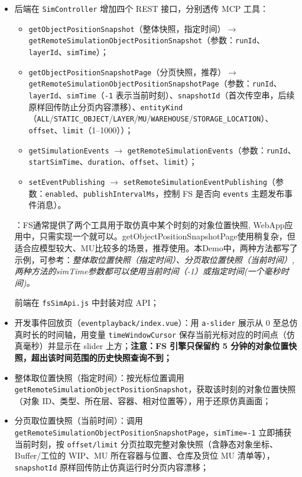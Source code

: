 \begin{enumerate}[label=\arabic*)]
	\begin{itemize}
		\item 后端在 \texttt{SimController} 增加四个 REST 接口，分别透传 MCP 工具：
		\begin{itemize}
			\item \texttt{getObjectPositionSnapshot}（整体快照，指定时间）$\rightarrow$ \texttt{getRemoteSimulationObjectPositionSnapshot}（参数：\texttt{runId}、\texttt{layerId}、\texttt{simTime}）；
			\item \texttt{getObjectPositionSnapshotPage}（分页快照，推荐）$\rightarrow$ \texttt{getRemoteSimulationObjectPositionSnapshotPage}（参数：\texttt{runId}、\texttt{layerId}、\texttt{simTime}（\texttt{-1} 表示当前时刻）、\texttt{snapshotId}（首次传空串，后续原样回传防止分页内容漂移）、\texttt{entityKind}（\texttt{ALL}/\texttt{STATIC\_OBJECT}/\texttt{LAYER}/\texttt{MU}/\texttt{WAREHOUSE}/\texttt{STORAGE\_LOCATION}）、\texttt{offset}、\texttt{limit}（1--1000））；
			\item \texttt{getSimulationEvents} $\rightarrow$ \texttt{getRemoteSimulationEvents}（参数：\texttt{runId}、\texttt{startSimTime}、\texttt{duration}、\texttt{offset}、\texttt{limit}）；
			\item \texttt{setEventPublishing} $\rightarrow$ \texttt{setRemoteSimulationEventPublishing}（参数：\texttt{enabled}、\texttt{publishIntervalMs}，控制 FS 是否向 \texttt{events} 主题发布事件消息）。
		\end{itemize}
        ：FS通常提供了两个工具用于取仿真中某个时刻的对象位置快照, WebApp应用中，只需实现一个就可以。getObjectPositionSnapshotPage使用稍复杂，但适合应模型较大、MU比较多的场景，推荐使用。本Demo中，两种方法都写了示例，可参考：\it{整体取位置快照（指定时间）}、\it{分页取位置快照（当前时间）}, 两种方法的simTime参数都可以使用当前时间（-1）或指定时间(一个毫秒时间)。\par
		前端在 \texttt{fsSimApi.js} 中封装对应 API；
		\item 开发事件回放页（\texttt{eventplayback/index.vue}）：用 \texttt{a-slider} 展示从 0 至总仿真时长的时间轴，用变量 \texttt{timeWindowCursor} 保存当前光标对应的时间点（仿真毫秒）并显示在 slider 上方；\bf{注意}：FS 引擎只保留约 5 分钟的对象位置快照，超出该时间范围的历史快照查询不到；
		\item 整体取位置快照（指定时间）：按光标位置调用 \texttt{getRemoteSimulationObjectPositionSnapshot}，获取该时刻的对象位置快照（对象 ID、类型、所在层、容器、相对位置等），用于还原仿真画面；
		\item 分页取位置快照（当前时间）：调用 \texttt{getRemoteSimulationObjectPositionSnapshotPage}，\texttt{simTime=-1} 立即捕获当前时刻，按 \texttt{offset/limit} 分页拉取完整对象快照（含静态对象坐标、Buffer/工位的 WIP、MU 所在容器与位置、仓库及货位 MU 清单等），\texttt{snapshotId} 原样回传防止仿真运行时分页内容漂移；

\end{itemize}
\end{enumerate}

